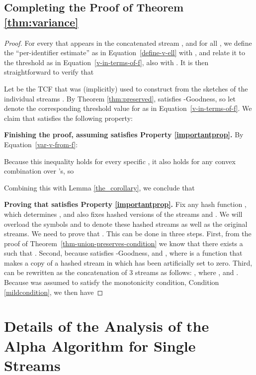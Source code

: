 \documentclass{article}
\begin{document}
\subsection{Completing the Proof of Theorem \ref{thm:variance}}
\label{sec:twoimpliesvariance}
\label{sec:finalvariance} 
\begin{proof}
For every  that appears in the concatenated stream , and for all ,
we define the ``per-identifier estimate''  as in Equation~\eqref{define-v-ell} with , and relate it to the threshold
 as in Equation~\eqref{v-in-terms-of-f}, also with . It is then straightforward to verify that



\noindent Let  be the TCF that was (implicitly) used to construct  from the  sketches of the individual streams .
By Theorem \ref{thm:preserved},  satisfies -Goodness, so let  denote the corresponding threshold value for  as in Equation~\eqref{v-in-terms-of-f}. 
We claim that  satisfies the following property:
 

\noindent \textbf{Finishing the proof, assuming  satisfies Property \ref{importantprop}.}
By Equation~\eqref{var-v-from-f}:



\noindent Because this inequality holds for every specific , it also holds for any convex combination over 
's, so 



Combining this with Lemma \ref{the_corollary},
we conclude that 


\noindent \textbf{Proving that  satisfies Property \ref{importantprop}.}
Fix any hash function , which determines , and also fixes hashed versions of
the streams  and . We will overload the symbols  and  to denote these hashed streams
as well as the original streams.
We need to prove that . 
This can be done in three steps. First, from the proof of Theorem~\ref{thm-union-preserves-condition}
we know that there exists a  such that .
Second, because  satisfies -Goodness, 
 and , where  is a function that 
makes a copy of a hashed stream in which  has been artificially set to zero.
Third,  can be rewritten as the concatenation of 3 streams as follows: , where , and . 
Because  was assumed to satisfy the monotonicity condition, Condition \ref{mildcondition}, we then have


\end{proof}

\section{Details of the Analysis of the Alpha Algorithm for Single Streams}
\end{document}
